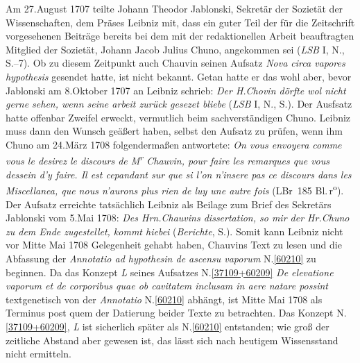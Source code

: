 Am 27.\;August 1707 teilte Johann Theodor Jablonski, Sekretär der Sozietät der Wissenschaften, dem Präses Leibniz mit, dass ein guter Teil der für die Zeitschrift vorgesehenen Beiträge bereits bei dem mit der redaktionellen Arbeit beauftragten Mitglied der Sozietät, Johann Jacob Julius Chuno, angekommen sei (\textit{LSB} I, N., S.--7).\cite{02563}
Ob zu diesem Zeitpunkt auch Chauvin seinen Aufsatz \textit{Nova circa vapores hypothesis} gesendet hatte, ist nicht bekannt.
Getan hatte er das wohl aber, bevor Jablonski am 8.\;Oktober 1707 an Leibniz schrieb: \textit{Der H.\;Chovin dörfte wol nicht gerne sehen, wenn seine arbeit zurück gesezet bliebe} (\textit{LSB} I, N., S.).\cite{02564}
Der Ausfsatz hatte offenbar Zweifel erweckt, vermutlich beim sachverständigen Chuno.%
%
%
%
\pend%
\pstart%
Leibniz muss dann den Wunsch geäßert haben, selbst den Aufsatz zu prüfen, wenn ihm Chuno am 24.\;März 1708 folgendermaßen antwortete: \textit{On vous envoyera comme vous le desirez le discours de M\textsuperscript{r} Chauvin, pour faire les remarques que vous}  \textit{dessein d'y faire. Il est cepandant sur que si l'on n'insere pas ce discours dans les Miscellanea, que nous n'aurons plus rien de luy une autre fois} (LBr~185 Bl.\,r\textsuperscript{o}).\cite{02565}
Der Aufsatz erreichte tatsächlich Leibniz als Beilage zum Brief des Sekretärs Jablonski vom 5.\;Mai 1708: \textit{Des Hrn.\;Chauvins dissertation, so mir der Hr.\;Chuno zu dem Ende zugestellet, kommt hiebei} (\textit{Berichte}, S.).\cite{02566}
Somit kann Leibniz nicht vor Mitte Mai 1708 Gelegenheit gehabt haben, Chauvins Text zu lesen und die Abfassung der \textit{Annotatio ad hypothesin de ascensu vaporum} N.\;\ref{60210} zu beginnen.
Da das Konzept \textit{L} seines Aufsatzes N.\;\ref{37109+60209} \textit{De elevatione vaporum et de corporibus quae ob cavitatem inclusam in aere natare possint} textgenetisch von der \textit{Annotatio} N.\;\ref{60210} abhängt, ist Mitte Mai 1708 als Terminus post quem der Datierung beider Texte zu betrachten.
Das Konzept N.\;\ref{37109+60209}, \textit{L} ist sicherlich später als N.\;\ref{60210} entstanden; wie groß der zeitliche Abstand aber gewesen ist, das lässt sich nach heutigem Wissensstand nicht ermitteln.%
%
%
%
